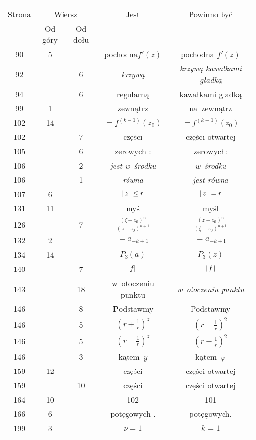 \documentclass[a4paper,11pt]{article}
\begin{document}
\begin{center}
  \begin{tabular}{|c|c|c|c|c|}
    \hline
    & \multicolumn{2}{c|}{} & & \\
    Strona & \multicolumn{2}{c|}{Wiersz} & Jest
                              & Powinno być \\ \cline{2-3}
    & Od góry & Od dołu & & \\
    \hline
    90  &  5 & & pochodna$f'( z )$ & pochodna $f'( z )$ \\
    92  & &  6 & \emph{krzywą} & \emph{krzywą kawałkami gładką} \\
    94  & &  6 & regularną & kawałkami gładką \\
    99  &  1 & & zewnątrz & na~zewnątrz \\
    102 & 14 & & $=\!\! f^{ ( k - 1 ) }( z_{ 0 } )$
           & $= f^{ ( k - 1 ) }( z_{ 0 } )$ \\
    102 & &  7 & części & części otwartej \\
    105 & &  6 & zerowych : & zerowych: \\
    106 & &  2 & \emph{jest w~środku} & \emph{w~środku} \\
    106 & &  1 & \emph{równa} & \emph{jest równa} \\
    107 &  6 & & $\left| \,  z  \, \right| \leq r$ & $\left| \,  z  \, \right| = r$ \\
    131 & 11 & & myś & myśl \\
    126 & &  7 & $\frac{ ( \zeta - z_{ 0 } )^{ n } }{
                 ( z - z_{ 0 } )^{ n + 1 } }$
           & $\frac{ ( z - z_{ 0 } )^{ n } }{
             ( \zeta - z_{ 0 } )^{ n + 1 } }$ \\
    132 &  2 & & $=\!\! a_{ -k + 1 }$ & $= a_{ -k + 1 }$ \\
    134 & 14 & & $P_{ 3 }( a )$ & $P_{ 3 }( z )$ \\
    140 & &  7 & $f |$ & $\left| \,  f  \, \right|$ \\
    143 & & 18 & w~otoczeniu punktu & \emph{w~otoczeniu punktu} \\
    146 & &  8 & \textbf{P}odstawmy & Podstawmy \\
    146 & &  5 & $( r + \frac{ 1 }{ r } )^{ z }$
           & $( r + \frac{ 1 }{ r } )^{ 2 }$ \\
    146 & &  5 & $( r - \frac{ 1 }{ r } )^{ z }$
           & $( r - \frac{ 1 }{ r } )^{ 2 }$ \\
    146 & &  3 & kątem~$y$ & kątem~$\varphi$ \\
    159 & 12 & & części & części otwartej \\
    159 & & 10 & części & części otwartej \\
    164 & 10 & & 102 & 101 \\
    166 &  6 & & potęgowych . & potęgowych. \\
    199 &  3 & & $\nu = 1 $ & $k = 1$ \\
    \hline
  \end{tabular}
\end{center}
\end{document}
